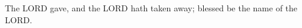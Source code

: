 \documentclass[MAIN]{subfiles}
\begin{document}
The {\hge LORD} gave, and the {\hge LORD} hath taken away; blessed be the name of the {\hge LORD}.
\end{document}
